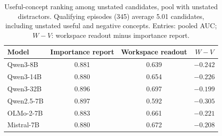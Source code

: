\begin{table}[t]
\centering
\caption{Useful-concept ranking among unstated candidates, pool with unstated distractors. Qualifying
episodes (345) average 5.01 candidates, including unstated useful and negative concepts. Entries:
pooled AUC; $W-V$: workspace readout minus importance report.}
\label{tab:withinunstated}
\small
\setlength{\tabcolsep}{5pt}
\begin{tabular}{lccc}
\toprule
Model & Importance report & Workspace readout & $W-V$ \\
\midrule
Qwen3-8B & 0.881 & 0.639 & $-0.242$ \\
Qwen3-14B & 0.880 & 0.654 & $-0.226$ \\
Qwen3-32B & 0.896 & 0.697 & $-0.199$ \\
Qwen2.5-7B & 0.897 & 0.592 & $-0.305$ \\
OLMo-2-7B & 0.883 & 0.661 & $-0.221$ \\
Mistral-7B & 0.880 & 0.672 & $-0.208$ \\
\bottomrule
\end{tabular}
\end{table}

